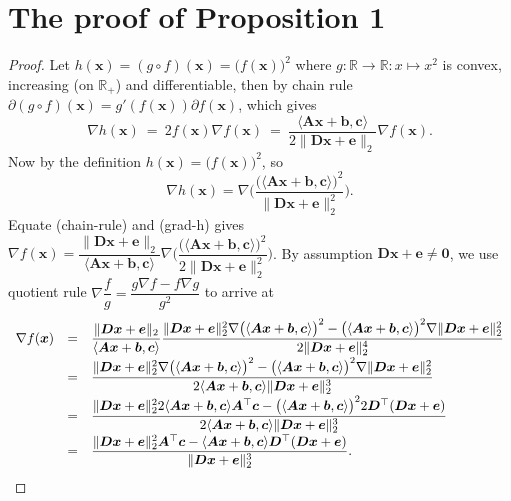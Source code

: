 \documentclass[sn-mathphys-num]{sn-jnl}
\def\zeros           {\bm{0}}            %
\def\IR  {\mathbb{R}} 	    %
\def\A {\bm{A}}
\def\D {\bm{D}}
\def\b {\bm{b}}
\def\c {\bm{c}}
\def\e {\bm{e}}
\def\x {\bm{x}}
\begin{document}
\appendix

\section{The proof of Proposition 1}
\begin{proof}
Let $h(\x) = (g\circ f)(\x) = \big(f(\x) \big)^2$ where  $g : \IR \to \IR : x \mapsto x^2$ is  convex, increasing (on $\IR_+$) and differentiable, then by chain rule 
$\partial (g\circ f)(\x) =
g'(f(\x)) \partial f(\x)$, which gives
\[
\nabla h(\x) 
~=~
2f(\x) \nabla f(\x) 
~=~
\dfrac{\langle \A \x + \b, \c \rangle}{2\| \D \x + \e \|_2} \nabla f(\x).
\tag{chain-rule}
\]
Now by the definition $h(\x) = \big(f(\x)\big)^2$, so
\[
\nabla h(\x) = \nabla \Bigg( \dfrac{\Big(\langle \A \x + \b, \c \rangle\Big)^2}{\| \D \x + \e \|_2^2}
\Bigg).
\tag{grad-h}
\]
Equate (chain-rule) and (grad-h) gives 
$
\nabla f(\x) 
= 
\dfrac{\| \D \x + \e \|_2}{\langle \A \x + \b, \c \rangle}
\nabla \bigg( \dfrac{\big(\langle \A \x + \b, \c \rangle\big)^2}{2\| \D \x + \e \|_2^2}
\bigg)
$.
By assumption $\D \x + \e \neq \zeros$, we use quotient rule $\nabla \dfrac{f}{g} = \dfrac{g \nabla f - f \nabla g}{g^2}$ to arrive at
\[
\begin{array}{rcl}
\nabla f(\x) 
&=&\displaystyle 
\dfrac{\| \D \x + \e \|_2}{\langle \A \x + \b, \c \rangle}
\dfrac{
\| \D \x + \e \|_2^2
\nabla \big(\langle \A \x + \b, \c \rangle\big)^2
-
\big(\langle \A \x + \b, \c \rangle\big)^2
\nabla \| \D \x + \e \|_2^2
}
{2\| \D \x + \e \|_2^4
}
\vspace{0.5mm}
\\
&=&
\displaystyle 
\dfrac{
\| \D \x + \e \|_2^2
\nabla \big(\langle \A \x + \b, \c \rangle\big)^2
-
\big(\langle \A \x + \b, \c \rangle\big)^2
\nabla \| \D \x + \e \|_2^2
}
{2\langle \A \x + \b, \c \rangle \| \D \x + \e \|_2^3 
}
\vspace{0.5mm}
\\
&=&
\displaystyle 
\dfrac{
\| \D \x + \e \|_2^2
2\langle \A \x + \b, \c \rangle \A^\top \c
-
\big(\langle \A \x + \b, \c \rangle\big)^2
2 \D^\top (\D \x + \e)
}
{2\langle \A \x + \b, \c \rangle \| \D \x + \e \|_2^3 
}
\vspace{0.5mm}
\\
&=&
\displaystyle 
\dfrac{
\| \D \x + \e \|_2^2 \A^\top \c
-
\langle \A \x + \b, \c \rangle
\D^\top (\D \x + \e)
}
{ \| \D \x + \e \|_2^3 
}.
\end{array}
\]
\end{proof}
\end{document}
